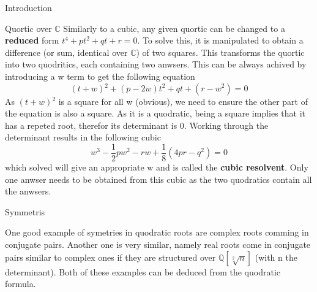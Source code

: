 \documentclass[12pt, letterpaper]{article}
\begin{document}
\begin{section}{Introduction}
\begin{subsection}{Quortic over \(\mathbb{C}\)}
    Similarly to a cubic, any given quortic can be changed to a
    \textbf{reduced} form \(t^{4} + pt^{2} + qt + r = 0\). To solve this, it is
    manipulated to obtain a difference (or sum, identical over \(\mathbb{C}\))
    of two squares. This transforms the quortic into two quodritics, each
    containing two anwsers. This can be always achived by introducing a w term
    to get the following equation
    \[(t + w){}^{2} + (p - 2w)t^{2} + qt + (r - w^{2}) = 0\]
    As \((t + w){}^{2}\) is a square for all w (obvious), we need to ensure the
    other part of the equation is also a square. As it is a quodratic, being a
    square implies that it has a repeted root, therefor its determinant is 0.
    Working through the determinant results in the following cubic
    \[w^{3} - \frac{1}{2}pw^{2} - rw + \frac{1}{8}(4pr - q^{2}) = 0\] which
    solved will give an appropriate w and is called the \textbf{cubic resolvent}.
    Only one anwser needs to be obtained from this cubic as the two quodratics
    contain all the anwsers.

  \end{subsection}

  \begin{subsection}{Symmetris}

    One good example of symetries in quodratic roots are complex roots comming
    in conjugate pairs. Another one is very similar, namely real roots come in
    conjugate pairs similar to complex ones if they are structured over
    \(\mathbb{Q}[\sqrt[2]{n}]\) (with n the determinant). Both of these examples
    can be deduced from the quodratic formula.

  \end{subsection}

\end{section}
\end{document}
